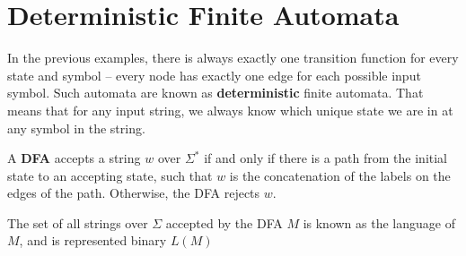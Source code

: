 \section*{Deterministic Finite Automata}

In the previous examples, there is always exactly one transition function for every state and symbol -- every node has
 exactly one edge for each possible input symbol. Such automata are known as \textbf{deterministic} finite automata.
 That means that for any input string, we always know which unique state we are in at any symbol in the string.

\begin{definition*}{}{}
  A \textbf{DFA} accepts a string $w$ over $\Sigma^*$ if and only if there is a path from the initial state to an
   accepting state, such that $w$ is the concatenation of the labels on the edges of the path. Otherwise, the DFA
   rejects $w$.

  The set of all strings over $\Sigma$ accepted by the DFA $M$ is known as the language of $M$, and is represented binary
   $L(M)$
\end{definition*}